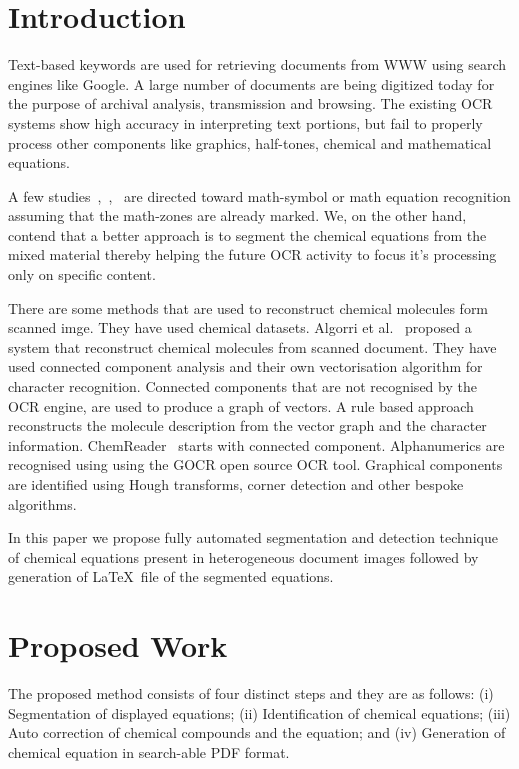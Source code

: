 \section{Introduction}
\label{intro}
Text-based keywords are used for retrieving  documents from  WWW using search 
engines like Google.
 A large number of documents are being digitized today for the purpose of archival analysis, transmission and browsing. The existing OCR systems show high accuracy in interpreting text portions, but fail to properly process other components like graphics, half-tones, chemical and mathematical equations.

A few studies~\cite{blostein_97},~\cite{chan_00},~\cite{Garain_07} are directed toward math-symbol or math equation recognition
assuming that the math-zones are already marked. We, on the other hand, contend that a better approach is to segment the chemical equations from the mixed material thereby helping the future OCR activity to focus it’s processing only on specific
content. 

There are some methods that are used to reconstruct chemical molecules form scanned imge. They have used chemical datasets. Algorri et al.~\cite{algorri_07, algorri_07a} proposed a system that reconstruct chemical molecules from scanned document. They have used connected component analysis and their own vectorisation algorithm for character recognition. Connected components that are not recognised by the OCR engine, are used to produce a graph of vectors. A rule based approach reconstructs the molecule description from the vector graph and the character information. 
ChemReader~\cite{park_09} starts with connected component. Alphanumerics are  recognised using using the GOCR open source OCR tool. Graphical components are  identified using Hough transforms, corner detection and other bespoke algorithms.

In this paper we propose fully automated segmentation and detection technique of chemical equations present in
heterogeneous document images followed by generation of \LaTeX\ file of the segmented equations.


\section{Proposed Work} 
\label{proposed_algo}
The proposed
method consists of four distinct steps and they are as follows: (i) Segmentation of displayed equations; (ii) Identification of
chemical equations; (iii) Auto correction of chemical compounds and the equation; and (iv) Generation of chemical equation in search-able PDF format.
 
